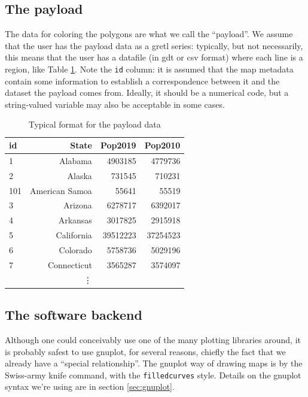\documentclass[a4paper]{article}
\begin{document}
\subsection{The payload}
\label{sec:payload}

The data for coloring the polygons are what we call the
``payload''. We assume that the user has the payload data as a gretl
series: typically, but not necessarily, this means that the user has a
datafile (in gdt or csv format) where each line is a region, like
Table \ref{tab:payload}. Note the \texttt{id} column: it is assumed
that the map metadata contain some information to establish a
correspondence between it and the dataset the payload comes
from. Ideally, it should be a numerical code, but a string-valued
variable may also be acceptable in some cases.


\begin{table}[htbp]
\begin{center}
\begin{tabular}{lrrr}
  \hline
  \textbf{id}	& \textbf{State}& \textbf{Pop2019} & \textbf{Pop2010} \\
  \hline
  1	& Alabama	& 4903185	& 4779736  \\ 
  2     & Alaska	& 731545	& 710231   \\ 
  101   & American Samoa	& 55641	& 55519	  \\ 
  3	& Arizona	& 6278717	& 6392017  \\ 
  4	& Arkansas	& 3017825	& 2915918  \\ 
  5	& California	& 39512223	& 37254523 \\ 
  6	& Colorado	& 5758736	& 5029196  \\ 
  7	& Connecticut	& 3565287	& 3574097  \\
                & \vdots & \\
  \hline
\end{tabular}
\end{center}
\caption{Typical format for the payload data}
\label{tab:payload}
\end{table}


\subsection{The software backend}
\label{sec:software}

Although one could conceivably use one of the many plotting libraries
around, it is probably safest to use gnuplot, for several reasons,
chiefly the fact that we already have a ``special relationship''. 
The gnuplot way of drawing maps is by the Swiss-army knife 
command, with the \texttt{filledcurves} style. Details on the gnuplot
syntax we're using are in section \ref{sec:gnuplot}.
\end{document}
